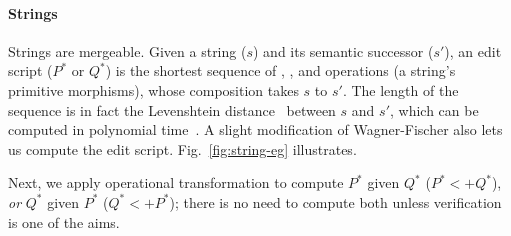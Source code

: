 \paragraph{Strings} Strings are mergeable. Given a string ($s$) and
its semantic successor ($s'$), an edit script ($P^*$ or $Q^*$) is the
shortest sequence of , , and 
operations (a string's primitive morphisms), whose composition takes $s$
to $s'$. The length of the sequence is in fact the Levenshtein
distance~\cite{levenstein} between $s$ and $s'$, which can be computed
in polynomial time~\cite{wagner-fischer}.
A slight modification of Wagner-Fischer also lets us compute the edit
script. Fig.~\ref{fig:string-eg} illustrates.

Next, we apply operational transformation to compute $P^*$ given $Q^*$
($P^* <+ Q^*$), \emph{or} $Q^*$ given $P^*$ ($Q^* <+ P^*$); there is
no need to compute both unless verification is one of the aims. 


\paragraph{}






